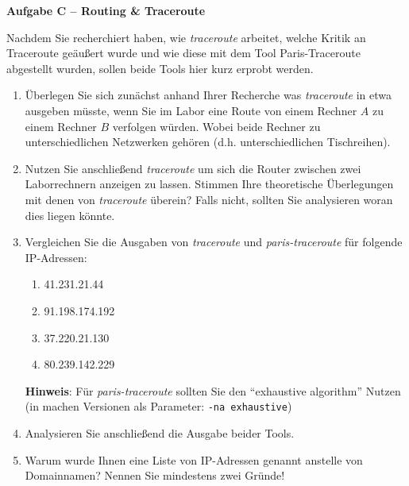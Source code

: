 \documentclass[paper=a4,fontsize=11pt]{scrartcl}%
\begin{document}
\begin{center}\Large{\textbf{Aufgabe C -- Routing \& Traceroute}}\end{center}\vskip0.25in
Nachdem Sie recherchiert haben, wie \emph{traceroute} arbeitet, welche Kritik an Traceroute geäußert wurde und wie diese mit dem Tool Paris-Traceroute abgestellt wurden, sollen beide Tools hier kurz erprobt werden.
\begin{enumerate}
	\item Überlegen Sie sich zunächst anhand Ihrer Recherche was \emph{traceroute} in etwa ausgeben müsste, wenn Sie im Labor eine Route von einem Rechner $A$ zu einem Rechner $B$ verfolgen würden. Wobei beide Rechner zu unterschiedlichen Netzwerken gehören (d.h. unterschiedlichen Tischreihen). 
	\item Nutzen Sie anschließend \emph{traceroute} um sich die Router zwischen zwei Laborrechnern anzeigen zu lassen. Stimmen Ihre theoretische Überlegungen mit denen von \emph{traceroute} überein? Falls nicht, sollten Sie analysieren woran dies liegen könnte.
	\item Vergleichen Sie die Ausgaben von \emph{traceroute} und \emph{paris-traceroute} für folgende IP-Adressen:
	\begin{enumerate}
		\item 41.231.21.44
		\item 91.198.174.192
		\item 37.220.21.130
		\item 80.239.142.229
	\end{enumerate}
	\textbf{Hinweis}: Für \emph{paris-traceroute} sollten Sie den \enquote{exhaustive algorithm} Nutzen (in machen Versionen als Parameter: \texttt{-na exhaustive})
	\item Analysieren Sie anschließend die Ausgabe beider Tools.
	\item Warum wurde Ihnen eine Liste von IP-Adressen genannt anstelle von Domainnamen? Nennen Sie mindestens zwei Gründe!
\end{enumerate}
\end{document}

